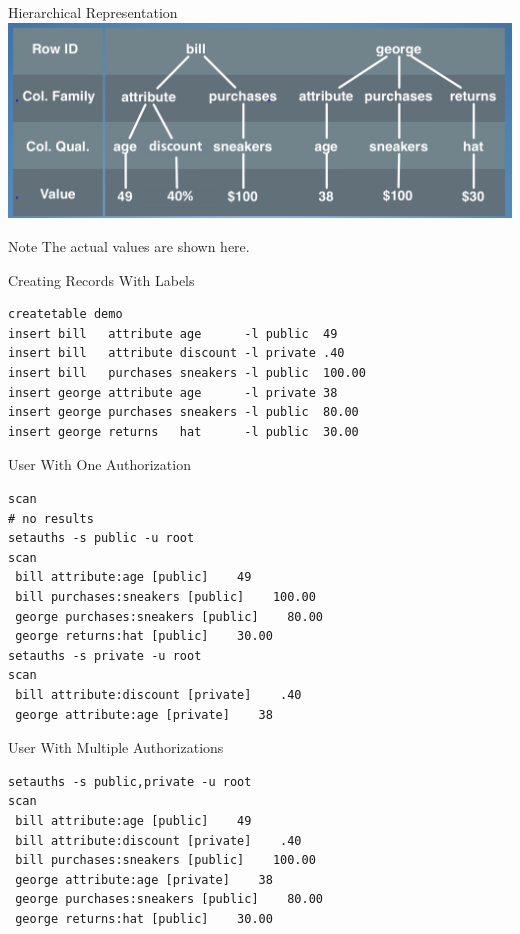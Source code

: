 \documentclass[t,landscape]{beamer}
\begin{document}
\begin{frame}{Hierarchical Representation}
\includegraphics[width=\textwidth]{images/concrete_hierarchical_decomposition_dmm.png}
\begin{block}{Note}
The actual values are shown here.
\end{block}
\end{frame}

\begin{frame}[fragile]{Creating Records With Labels}
\begin{verbatim}
createtable demo
insert bill   attribute age      -l public  49
insert bill   attribute discount -l private .40
insert bill   purchases sneakers -l public  100.00
insert george attribute age      -l private 38
insert george purchases sneakers -l public  80.00
insert george returns   hat      -l public  30.00
\end{verbatim}
\end{frame}

\begin{frame}[fragile]{User With One Authorization}
\begin{verbatim}
scan
# no results
setauths -s public -u root
scan
 bill attribute:age [public]    49
 bill purchases:sneakers [public]    100.00
 george purchases:sneakers [public]    80.00
 george returns:hat [public]    30.00
setauths -s private -u root
scan
 bill attribute:discount [private]    .40
 george attribute:age [private]    38
\end{verbatim}
\end{frame}

\begin{frame}[fragile]{User With Multiple Authorizations}
\begin{verbatim}
setauths -s public,private -u root
scan
 bill attribute:age [public]    49
 bill attribute:discount [private]    .40
 bill purchases:sneakers [public]    100.00
 george attribute:age [private]    38
 george purchases:sneakers [public]    80.00
 george returns:hat [public]    30.00
\end{verbatim}
\end{frame}
\end{document}
